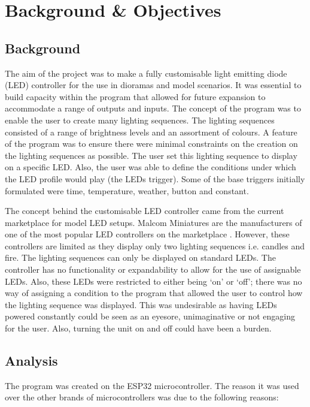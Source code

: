 \chapter{Background \& Objectives}
\section{Background}
The aim of the project was to make a fully customisable light emitting diode (LED) controller for the use in dioramas and model scenarios. It was essential to build capacity within the program that allowed for future expansion to accommodate a range of outputs and inputs. The concept of the program was to enable the user to create many lighting sequences. The lighting sequences consisted of a range of brightness levels and an assortment of colours. A feature of the program was to ensure there were minimal constraints on the creation on the lighting sequences as possible. The user set this lighting sequence to display on a specific LED. Also, the user was able to define the conditions under which the LED profile would play (the LEDs trigger). Some of the base triggers initially formulated were time, temperature, weather, button and constant.

The concept behind the customisable LED controller came from the current marketplace for model LED setups. Malcom Miniatures are the manufacturers of one of the most popular LED controllers on the marketplace \cite{MMinitures}. However, these controllers are limited as they display only two lighting sequences i.e. candles and fire. The lighting sequences can only be displayed on standard LEDs. The controller has no functionality or expandability to allow for the use of assignable LEDs. Also, these LEDs were restricted to either being ‘on’ or ‘off’; there was no way of assigning a condition to the program that allowed the user to control how the lighting sequence was displayed. This was undesirable as having LEDs powered constantly could be seen as an eyesore, unimaginative or not engaging for the user. Also, turning the unit on and off could have been a burden.

\section{Analysis}
The program was created on the ESP32 microcontroller. The reason it was used over the other brands of microcontrollers was due to the following reasons:


